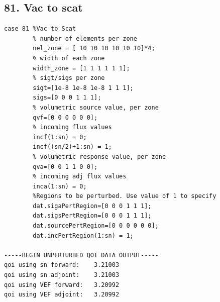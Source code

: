 \documentclass{article}
\begin{document}
\subsection{81. Vac to scat}
\begin{verbatim}
case 81 %Vac to Scat
        % number of elements per zone
        nel_zone = [ 10 10 10 10 10 10]*4;
        % width of each zone
        width_zone = [1 1 1 1 1 1];
        % sigt/sigs per zone
        sigt=[1e-8 1e-8 1e-8 1 1 1];
        sigs=[0 0 0 1 1 1];
        % volumetric source value, per zone
        qvf=[0 0 0 0 0 0];
        % incoming flux values
        incf(1:sn) = 0;
        incf((sn/2)+1:sn) = 1;
        % volumetric response value, per zone
        qva=[0 0 1 1 0 0];
        % incoming adj flux values
        inca(1:sn) = 0;
        %Regions to be perturbed. Use value of 1 to specify
        dat.sigaPertRegion=[0 0 0 1 1 1];
        dat.sigsPertRegion=[0 0 0 1 1 1];
        dat.sourcePertRegion=[0 0 0 0 0 0];
        dat.incPertRegion(1:sn) = 1;
        
-----BEGIN UNPERTURBED QOI DATA OUTPUT----- 
qoi using sn forward: 	 3.21003 
qoi using sn adjoint: 	 3.21003 
qoi using VEF forward: 	 3.20992 
qoi using VEF adjoint: 	 3.20992 
\end{verbatim}
\end{document}
